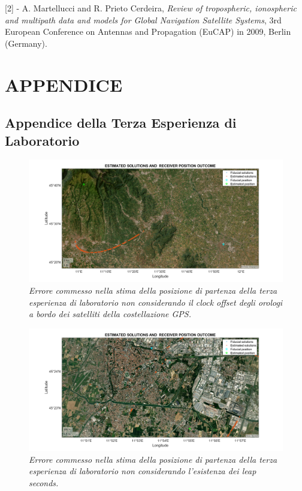 \documentclass[a4paper,11pt,twoside]{book}
\begin{document}
	[2] - A. Martellucci and R. Prieto Cerdeira, \textit{Review of tropospheric, ionospheric and multipath data and models for Global Navigation Satellite Systems}, 3rd European Conference on Antennas and Propagation (EuCAP) in 2009, Berlin (Germany).
	
	\chapter{APPENDICE}
	
	\section{Appendice della Terza Esperienza di Laboratorio}

	\begin{figure}[H]
		\centering
		\includegraphics[scale=0.31]{"Immagini workbook/Immagini esp3/err_clock"}
		\caption{\textit{Errore commesso nella stima della posizione di partenza della terza esperienza di laboratorio non considerando il clock offset degli orologi a bordo dei satelliti della costellazione GPS.}}
		\label{fig:errclock}
	\end{figure}

	\vspace{-1cm}
	
	\begin{figure}[H]
		\centering
		\includegraphics[scale=0.31]{"Immagini workbook/Immagini esp3/err_leap_sec"}
		\caption{\textit{Errore commesso nella stima della posizione di partenza della terza esperienza di laboratorio non considerando l'esistenza dei leap seconds.}}
		\label{fig:errleap3}
	\end{figure}
\end{document}
